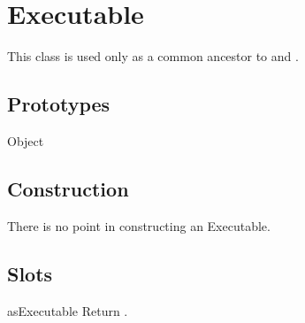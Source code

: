 
\section{Executable}

This class is used only as a common ancestor to 
and .

\subsection{Prototypes}
\begin{refObjects}
\item[Object]
\end{refObjects}

\subsection{Construction}

There is no point in constructing an Executable.

\subsection{Slots}

\begin{urbiscriptapi}
\item[asExecutable] Return \this.
\end{urbiscriptapi}


